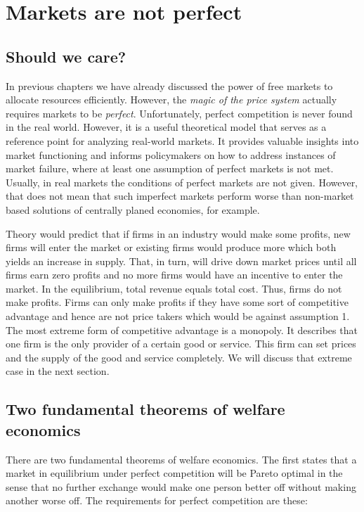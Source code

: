 \section{Markets are not perfect}

\subsection{Should we care?}

In previous chapters we have already discussed the power of free markets to allocate resources efficiently. However, the \textit{magic of the price system} actually requires markets to be \textit{perfect}. 	
Unfortunately, perfect competition is never found in the real world. However, it is a useful theoretical model that serves as a reference point for analyzing real-world markets. It provides valuable insights into market functioning and informs policymakers on how to address instances of market failure, where at least one assumption of perfect markets is not met. 
Usually, in real markets the conditions of perfect markets are not given. However, that does not mean that such imperfect markets perform worse than non-market based solutions of centrally planed economies, for example. 


Theory would predict that if firms in an industry would make some profits, new firms will enter the market or existing firms would produce more which both yields an increase in supply. That, in turn, will drive down  market prices until all firms earn zero profits and no more firms would have an incentive to enter the market. In the equilibrium, total revenue equals total cost. Thus, firms do not make profits. Firms can only make profits if they have some sort of competitive advantage and hence are not price takers which would be against assumption 1. The most extreme form of competitive advantage is a monopoly. It describes that one firm is the only provider of a certain good or service. This firm can set prices and the supply of the good and service completely. We will discuss that extreme case in the next section.






\subsection{Two fundamental theorems of welfare economics}\label{sec:2theorems}
There are two fundamental theorems of welfare economics. The first states that a market in equilibrium under perfect competition will be Pareto optimal in the sense that no further exchange would make one person better off without making another worse off. The requirements for perfect competition are these:



